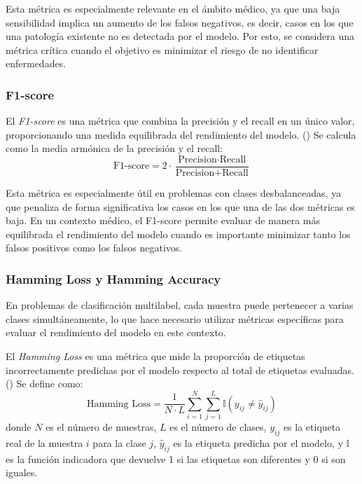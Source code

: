 \documentclass[12pt,a4paper,twoside]{book}
\begin{document}
Esta métrica es especialmente relevante en el ámbito médico, ya que una baja sensibilidad implica un aumento de los falsos negativos, es decir, casos en los que una patología existente no es detectada por el modelo. 
Por esto, se considera una métrica crítica cuando el objetivo es minimizar el riesgo de no identificar enfermedades.

\subsubsection*{F1-score}

El \textit{F1-score} es una métrica que combina la precisión y el recall en un único valor, proporcionando una medida equilibrada del rendimiento del modelo. (\cite{encord_f1_score_ml})
Se calcula como la media armónica de la precisión y el recall:
\begin{equation*}
	\text{F1-score} = 2 \cdot \frac{\text{Precision} \cdot \text{Recall}}{\text{Precision} + \text{Recall}}
\end{equation*}

Esta métrica es especialmente útil en problemas con clases desbalanceadas, ya que penaliza de forma significativa los casos en los que una de las dos métricas es baja.
En un contexto médico, el F1-score permite evaluar de manera más equilibrada el rendimiento del modelo cuando es importante minimizar tanto los falsos positivos como los falsos negativos.

\subsubsection*{Hamming Loss y Hamming Accuracy}

En problemas de clasificación multilabel, cada muestra puede pertenecer a varias clases simultáneamente, lo que hace necesario utilizar métricas específicas para evaluar el rendimiento del modelo en este contexto.

El \textit{Hamming Loss} es una métrica que mide la proporción de etiquetas incorrectamente predichas por el modelo respecto al total de etiquetas evaluadas. (\cite{amit_classification_metrics})
Se define como:
\begin{equation*}
	\text{Hamming Loss} = \frac{1}{N \cdot L} \sum_{i=1}^{N} \sum_{j=1}^{L} \mathbb{I}(y_{ij} \neq \hat{y}_{ij})
\end{equation*}
donde $N$ es el número de muestras, $L$ es el número de clases, $y_{ij}$ es la etiqueta real de la muestra $i$ para la clase $j$, $\hat{y}_{ij}$ es la etiqueta predicha por el modelo, y $\mathbb{I}$ es la función indicadora que devuelve 1 si las etiquetas son diferentes y 0 si son iguales.
\end{document}
